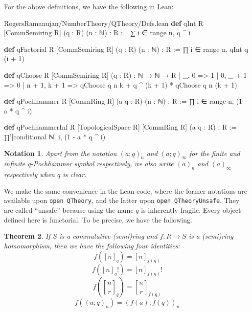 \documentclass[12pt]{amsart}
\newtheorem{theorem}{Theorem}[subsection]
\newtheorem{notation}[theorem]{Notation}
\theoremstyle{definition}
\theoremstyle{remark}
\numberwithin{equation}{subsection}
\newcommand{\qbinom}[3][q]{\genfrac{[}{]}{0pt}{}{#2}{#3}_{#1}}
\newcommand{\kw}[1]{\textcolor{keywordcolor}{\textbf{#1}}}
\newcommand{\var}[1]{\textcolor{tacticcolor}{#1}}
\newcommand{\num}[1]{\textcolor{numcolor}{#1}}
\newcommand{\imp}[1]{\textcolor{commentcolor}{\textbraceleft#1\textbraceright}}
\begin{document}
For the above definitions, we have the following in Lean:

\begin{code}{RogersRamanujan/NumberTheory/QTheory/Defs.lean}
\kw{def} qInt \imp{R} [CommSemiring \var{R}] (\var{q} : \var{R}) (\var{n} : ℕ) : \var{R} :=
  ∑ \var{i} ∈ range \var{n}, \var{q} ^ \var{i}

\kw{def} qFactorial \imp{R} [CommSemiring \var{R}] (\var{q} : \var{R}) (\var{n} : ℕ) : \var{R} :=
  ∏ \var{i} ∈ range \var{n}, qInt \var{q} (\var{i} + \num{1})

\kw{def} qChoose \imp{R} [CommSemiring \var{R}] (\var{q} : \var{R}) : ℕ → ℕ → \var{R}
  | _, \num{0} => \num{1}
  | \num{0}, _ + \num{1} => \num{0}
  | \var{n} + \num{1}, \var{k} + \num{1} => qChoose \var{q} \var{n} \var{k} + \var{q} ^ (\var{k} + \num{1}) * qChoose \var{q} \var{n} (\var{k} + \num{1})

\kw{def} qPochhammer \imp{R} [CommRing \var{R}] (\var{a} \var{q} : \var{R}) (\var{n} : ℕ) : \var{R} :=
  ∏ \var{i} ∈ range \var{n}, (\num{1} - \var{a} * \var{q} ^ \var{i})

\kw{def} qPochhammerInf \imp{R} [TopologicalSpace \var{R}] [CommRing \var{R}] (\var{a} \var{q} : \var{R}) : \var{R} :=
  ∏'[conditional ℕ] \var{i}, (\num{1} - \var{a} * \var{q} ^ \var{i})
\end{code}

\begin{notation}
    Apart from the notation $(a; q)_n$ and $(a; q)_\infty$ for the finite and infinite q-Pochhammer symbol respectively, we also write $(a)_n$ and $(a)_\infty$ respectively when $q$ is clear.
\end{notation}

We make the same convenience in the Lean code, where the former notations are available upon \texttt{open QTheory}, and the latter upon \texttt{open QTheoryUnsafe}. They are called ``unsafe'' because using the name $q$ is inherently fragile.
Every object defined here is functorial. To be precise, we have the following.

\begin{theorem}
If $S$ is a commutative (semi)ring and $f: R \to S$ is a (semi)ring homomorphism, then we have the following four identities:
\begin{equation}
f([n]_q) = [n]_{f(q)}
\end{equation}
\begin{equation}
f([n]_q!) = [n]_{f(q)}!
\end{equation}
\begin{equation}
f\left(\qbinom{n}{r}\right) = \qbinom[f(q)]{n}{r}
\end{equation}
\begin{equation}
f\left((a;q)_n\right) = (f(a); f(q))_n
\end{equation}
\end{theorem}
\end{document}
